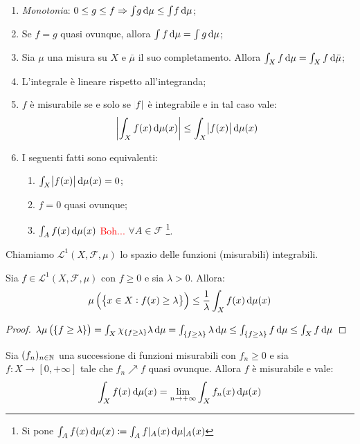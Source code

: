 \begin{enumerate}
    \item \emph{Monotonia}: $ 0 \leq g \leq f \Rightarrow \int\! g\dif\mu \leq \int\! f\dif\mu $;
    \item \label{it:quasi_ovunque}Se $ f=g $ quasi ovunque, allora $ \int f\dif\mu = \int g\dif\mu $;
    \item Sia $ \mu $ una misura su $ X $ e $ \bar{\mu} $ il suo completamento. Allora $ \int_X f\dif\mu = \int_X f\dif\bar{\mu} $;
    \item L'integrale è lineare rispetto all'integranda;
    \item $ f $ è misurabile se e solo se $ \abs{f} $ è integrabile e in tal caso vale:
    \[ \abs{ \int_X f(x)\dif\mu(x)} \leq \int_X \abs{f(x)}\dif\mu(x) \]
    \item I seguenti fatti sono equivalenti:
    \begin{enumerate}[label=(\roman*)]
        \item $ \int_X \abs{f(x)}\dif\mu(x) = 0$;
        \item $ f = 0 $ quasi ovunque;
        \item $ \int_A f(x)\dif\mu(x) $ \textcolor{red}{Boh...} $ \forall A\in\mathcal{F} $ \footnote{Si pone $ \int_A f(x)\dif\mu(x) \coloneqq \int_A f\rvert_A(x) \dif\mu\rvert_A(x) $}.
    \end{enumerate}
\end{enumerate}
\begin{definition}
    Chiamiamo $ \mathscr{L}^1(X,\mathcal{F},\mu) $ lo spazio delle funzioni (misurabili) integrabili.
\end{definition}
\begin{exercise}
    Sia $ f\in\mathscr{L}^1(X,\mathcal{F},\mu) $ con $ f\geq 0 $ e sia $ \lambda > 0 $. Allora:
    \[ \mu\left( \left\{ x\in X : f(x) \ge \lambda \right\}  \right) \leq \frac{1}{\lambda}\int_X f(x)\dif\mu(x) \]
\end{exercise}
\begin{proof}
    $ \lambda\mu\left( \{ f \geq \lambda \} \right) = \int_X \chi_{ \{f\geq\lambda \} } \lambda \dif\mu = \int_{ \{ f \geq \lambda \} } \lambda \dif\mu \leq \int_{ \{ f \geq \lambda \} } f\dif\mu \leq \int_X f\dif\mu $
\end{proof}
\begin{thm}
    Sia $ (f_n)_{n\in\mathbb{N}} $ una successione di funzioni misurabili con $ f_n \geq 0 $ e sia $ f\colon X\to[0,+\infty] $ tale che $ f_n\nearrow f $ quasi ovunque. Allora $ f $ è misurabile e vale:
    \[ \int_X f(x)\dif\mu(x) = \lim_{n\to+\infty} \int_X f_n(x)\dif\mu(x) \]
\end{thm}
